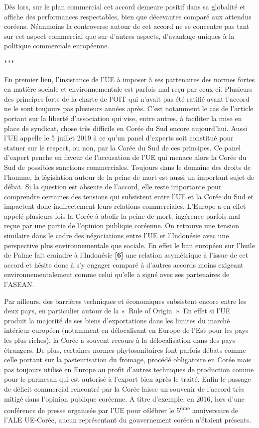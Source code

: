 \documentclass[11pt,a4paper]{article}
\newcommand{\partbreak}{\par\begin{center}\color{muted}$\ast$\quad$\ast$\quad$\ast$\end{center}\par}
\begin{document}
Dès lors, sur le plan commercial cet accord demeure positif dans sa globalité et affiche des performances respectables, bien que décevantes comparé aux attendus coréens. Néanmoins la controverse autour de cet accord ne se concentre pas tant sur cet aspect commercial que sur d'autres aspects, d'avantage uniques à la politique commerciale européenne.

\partbreak

En premier lieu, l'insistance de l'UE à imposer à ses partenaires des normes fortes en matière sociale et environnementale est parfois mal reçu par ceux-ci. Plusieurs des principes forts de la charte de l'OIT qui n'avait pas été ratifié avant l'accord ne le sont toujours pas plusieurs années après. C'est notamment le cas de l'article portant sur la liberté d'association qui vise, entre autres, à faciliter la mise en place de syndicat, chose très difficile en Corée du Sud encore aujourd'hui. Aussi l'UE appelle le 5 juillet 2019 à ce qu'un panel d'experts soit constitué pour statuer sur le respect, ou non, par la Corée du Sud de ces principes. Ce panel d'expert penche en faveur de l'accusation de l'UE qui menace alors la Corée du Sud de possibles sanctions commerciales. Toujours dans le domaine des droits de l'homme, la législation autour de la peine de mort est aussi un important sujet de débat. Si la question est absente de l'accord, elle reste importante pour comprendre certaines des tensions qui subsistent entre l'UE et la Corée du Sud et impactent donc indirectement leurs relations commerciales. L'Europe a en effet appelé plusieurs fois la Corée à abolir la peine de mort, ingérence parfois mal reçue par une partie de l'opinion publique coréenne. On retrouve une tension similaire dans le cadre des négociations entre l'UE et l'Indonésie avec une perspective plus environnementale que sociale. En effet le ban européen sur l'huile de Palme fait craindre à l'Indonésie \textbf{{[}6{]}} une relation asymétrique à l'issue de cet accord et hésite donc à s'y engager comparé à d'autres accords moins exigeant environnementalement comme celui qu'elle a signé avec ses partenaires de l'ASEAN.

Par ailleurs, des barrières techniques et économiques subsistent encore entre les deux pays, en particulier autour de la «~Rule of Origin~». En effet si l'UE produit la majorité de ses biens d'exportations dans les limites du marché intérieur européen (notamment en délocalisant en Europe de l'Est pour les pays les plus riches), la Corée a souvent recours à la délocalisation dans des pays étrangers. De plus, certaines normes phytosanitaires font parfois débats comme celle portant sur la pasteurisation du fromage, procédé obligatoire en Corée mais pas toujours utilisé en Europe au profit d'autres techniques de production comme pour le parmesan qui est autorisé à l'export bien après le traité. Enfin le passage de déficit commercial rencontré par la Corée laisse un souvenir de l'accord très mitigé dans l'opinion publique coréenne. A titre d'exemple, en 2016, lors d'une conférence de presse organisée par l'UE pour célébrer le 5\textsuperscript{ème} anniversaire de l'ALE UE-Corée, aucun représentant du gouvernement coréen n'étaient présents.
\end{document}
